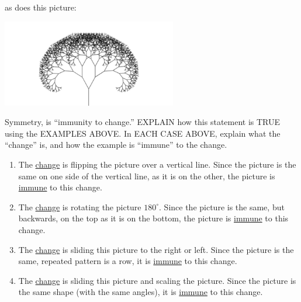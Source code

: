 \documentclass[noauthor,nooutcomes,12pt]{ximera}
\begin{document}
\begin{question}
\begin{freeResponse}
\begin{enumerate}
      as does this picture:
      \begin{center}
        \includegraphics[width=3in]{fractalTree.png}
      \end{center}
    \end{enumerate}
  \end{freeResponse}
\end{question}
\mynewpage


\begin{question}
  Symmetry, is ``immunity to change.'' EXPLAIN how this statement is
  TRUE using the EXAMPLES ABOVE. In EACH CASE ABOVE, explain what the
  ``change'' is, and how the example is ``immune'' to the change.
  \begin{freeResponse}
    \begin{enumerate}
      \item The \underline{change} is flipping the picture over a
        vertical line. Since the picture is the same on one side of
        the vertical line, as it is on the other, the picture is
        \underline{immune} to this change.
      \item The \underline{change} is rotating the picture
        $180^\circ$. Since the picture is the same, but backwards, on
        the top as it is on the bottom, the picture is
        \underline{immune} to this change.
      \item The \underline{change} is sliding this picture to the
        right or left. Since the picture is the same, repeated pattern
        is a row, it is \underline{immune} to this change.
      \item The \underline{change} is sliding this picture and scaling
        the picture. Since the picture is the same shape (with the
        same angles), it is \underline{immune} to this change.
    \end{enumerate}
  \end{freeResponse}
\end{question}
\mynewpage
\end{document}
